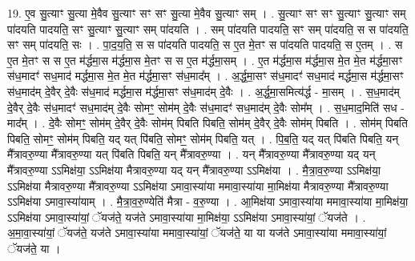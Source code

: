 \documentclass[17pt]{extarticle}
\begin{document}
19. ए॒व सु॒त्याꣳ सु॒त्या मे॒वैव सु॒त्याꣳ सꣳ सꣳ सु॒त्या मे॒वैव सु॒त्याꣳ सम् । . सु॒त्याꣳ सꣳ सꣳ सु॒त्याꣳ सु॒त्याꣳ सम् पा॑दयति पादयति॒ सꣳ सु॒त्याꣳ सु॒त्याꣳ सम् पा॑दयति । . सम् पा॑दयति पादयति॒ सꣳ सम् पा॑दयति॒ स स पा॑दयति॒ सꣳ सम् पा॑दयति॒ सः । . पा॒द॒य॒ति॒ स स पा॑दयति पादयति॒ स ए॒त मे॒तꣳ स पा॑दयति पादयति॒ स ए॒तम् । . स ए॒त मे॒तꣳ स स ए॒त म॑र्द्धमा॒स म॑र्द्धमा॒स मे॒तꣳ स स ए॒त म॑र्द्धमा॒सम् । . ए॒त म॑र्द्धमा॒स म॑र्द्धमा॒स मे॒त मे॒त म॑र्द्धमा॒सꣳ स॑ध॒मादꣳ॑ सध॒माद॑ मर्द्धमा॒स मे॒त मे॒त म॑र्द्धमा॒सꣳ स॑ध॒माद᳚म् । . अ॒र्द्ध॒मा॒सꣳ स॑ध॒मादꣳ॑ सध॒माद॑ मर्द्धमा॒स म॑र्द्धमा॒सꣳ स॑ध॒माद॑म् दे॒वैर् दे॒वैः स॑ध॒माद॑ मर्द्धमा॒स म॑र्द्धमा॒सꣳ स॑ध॒माद॑म् दे॒वैः । . अ॒र्द्ध॒मा॒समित्य॑र्द्ध - मा॒सम् । . स॒ध॒माद॑म् दे॒वैर् दे॒वैः स॑ध॒मादꣳ॑ सध॒माद॑म् दे॒वैः सोमꣳ॒॒ सोम॑म् दे॒वैः स॑ध॒मादꣳ॑ सध॒माद॑म् दे॒वैः सोम᳚म् । . स॒ध॒माद॒मिति॑ सध - माद᳚म् । . दे॒वैः सोमꣳ॒॒ सोम॑म् दे॒वैर् दे॒वैः सोम॑म् पिबति पिबति॒ सोम॑म् दे॒वैर् दे॒वैः सोम॑म् पिबति । . सोम॑म् पिबति पिबति॒ सोमꣳ॒॒ सोम॑म् पिबति॒ यद् यत् पि॑बति॒ सोमꣳ॒॒ सोम॑म् पिबति॒ यत् । . पि॒ब॒ति॒ यद् यत् पि॑बति पिबति॒ यन् मै᳚त्रावरु॒ण्या मै᳚त्रावरु॒ण्या यत् पि॑बति पिबति॒ यन् मै᳚त्रावरु॒ण्या । . यन् मै᳚त्रावरु॒ण्या मै᳚त्रावरु॒ण्या यद् यन् मै᳚त्रावरु॒ण्या ऽऽमिक्ष॑या॒ ऽऽमिक्ष॑या मैत्रावरु॒ण्या यद् यन् मै᳚त्रावरु॒ण्या ऽऽमिक्ष॑या । . मै॒त्रा॒व॒रु॒ण्या ऽऽमिक्ष॑या॒ ऽऽमिक्ष॑या मैत्रावरु॒ण्या मै᳚त्रावरु॒ण्या ऽऽमिक्ष॑या ऽमावा॒स्या॑या ममावा॒स्या॑या मा॒मिक्ष॑या मैत्रावरु॒ण्या मै᳚त्रावरु॒ण्या ऽऽमिक्ष॑या ऽमावा॒स्या॑याम् । . मै॒त्रा॒व॒रु॒ण्येति॑ मैत्रा - व॒रु॒ण्या । . आ॒मिक्ष॑या ऽमावा॒स्या॑या ममावा॒स्या॑या मा॒मिक्ष॑या॒ ऽऽमिक्ष॑या ऽमावा॒स्या॑यां॒ ॅयज॑ते॒ यज॑ते ऽमावा॒स्या॑या मा॒मिक्ष॑या॒ ऽऽमिक्ष॑या ऽमावा॒स्या॑यां॒ ॅयज॑ते । . अ॒मा॒वा॒स्या॑यां॒ ॅयज॑ते॒ यज॑ते ऽमावा॒स्या॑या ममावा॒स्या॑यां॒ ॅयज॑ते॒ या या यज॑ते ऽमावा॒स्या॑या ममावा॒स्या॑यां॒ ॅयज॑ते॒ या । \newline
\end{document}

